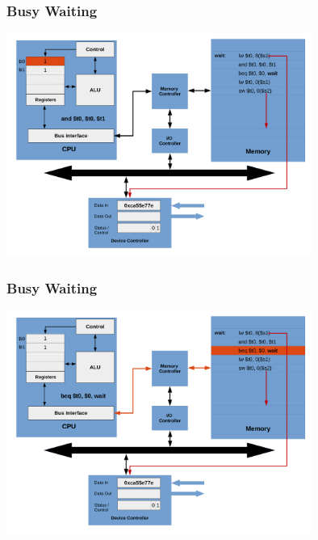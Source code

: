 \documentclass{beamer}
\begin{document}
\begin{frame}%
\frametitle{Busy Waiting}

\vspace*{-0.2cm}
\begin{center}
\hspace*{-1cm}\includegraphics[width=10cm]{busy_waiting15.pdf}
\end{center}

\end{frame}

\begin{frame}%
\frametitle{Busy Waiting}

\vspace*{-0.2cm}
\begin{center}
\hspace*{-1cm}\includegraphics[width=10cm]{busy_waiting16.pdf}
\end{center}

\end{frame}
\end{document}
